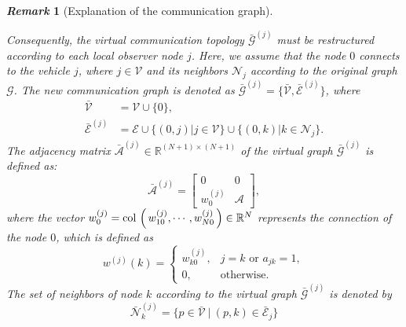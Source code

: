 \documentclass[letterpaper, 10pt, conference]{ieeeconf}  %
\def\col#1{\mathop{{\rm col}\,\left(\,#1\,\right)}}
\def\V{\mathcal{V}} %
\def\E{\mathcal{E}} %
\def\G{\mathcal{G}} %
\def\A{\mathcal{A}} %
\def\N{\mathcal{N}} %
\newtheorem{remark}{\it Remark}%
\newtheorem{alert}{\color{red}\it Alert Remark}
\begin{document}
\begin{remark}[Explanation of the communication graph]\label{rmk_graph}

    Consequently, the virtual communication topology $\bar{\G}^{(j)}$ must be restructured according to each local observer node $j$. 
    Here, we assume that the node $0$ connects to the vehicle $j$, where $j \in \V$ and its neighbors $\N_{j}$ according to the original graph $\G$. 
    The new communication graph is denoted as $\bar{\G}^{(j)} = \{ \bar{\V}, \bar{\E}^{(j)} \}$, where
    \begin{equation}
        \begin{aligned}
            \bar{\V} &= \V \cup \{0\}, \\
            \bar{\E}^{(j)} &= \E \cup \{ (0,j) | j \in \V \} \cup \{ (0,k) | k \in \N_{j} \}.
        \end{aligned}
    \end{equation}
    The adjacency matrix $\bar{\A}^{(j)}  \in \mathbb{R}^{(N+1) \times (N+1)}$ of the virtual graph $\bar{\G}^{(j)}$ is defined as:
    \begin{equation}
        \bar{\A}^{(j)}  = \begin{bmatrix} 0 & 0 \\
                        w_{0}^{(j)} & \A \end{bmatrix},
    \end{equation}  
    where the vector $w_{0}^{(j)} = \col{w_{10}^{(j)}, \cdots, w_{N0}^{(j)}}  \in \mathbb{R}^{N}$ represents the connection of the node $0$, which is defined as
    \begin{equation}
     {w}^{(j)}(k) = \begin{cases}
            w_{k0}^{(j)}, &  j = k \text{ or } a_{jk} = 1, \\
            0, & \text{otherwise}.
        \end{cases}
    \end{equation}
    The set of neighbors of node $k$ according to the virtual graph $\bar{\G}^{(j)}$ is denoted by
    \begin{equation}
        \bar{\N}_{k}^{(j)} = \{ p \in \bar{\V} \ | \ (p,k) \in \bar{\E}_{j} \}
    \end{equation}
\end{remark}

\end{document}
